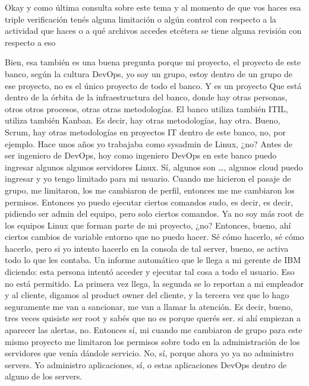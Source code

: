 \begin{description}[leftmargin=0cm, labelsep=0.5cm]
    \item[\textbf{MOCIULSKY SANTIAGO:}] Okay y como última consulta sobre este tema y al momento de que vos haces esa triple verificación tenés alguna limitación o algún control con respecto a la actividad que haces o a qué archivos accedes etcétera se tiene alguna revisión con respecto a eso

    \item[\textbf{VILLARINO PABLO RODOLFO:}] Bien, esa también es una buena pregunta porque mi proyecto, el proyecto de este banco, según la cultura DevOps, yo soy un grupo, estoy dentro de un grupo de ese proyecto, no es el único proyecto de todo el banco. Y es un proyecto Que está dentro de la órbita de la infraestructura del banco, donde hay otras personas, otros otros procesos, otras otras metodologías. El banco utiliza también ITIL, utiliza también Kanban. Es decir, hay otras metodologías, hay otra. Bueno, Scrum, hay otras metodologías en proyectos IT dentro de este banco, no, por ejemplo. Hace unos años yo trabajaba como sysadmin de Linux, ¿no? Antes de ser ingeniero de DevOps, hoy como ingeniero DevOps en este banco puedo ingresar algunos algunos servidores Linux. Sí, algunos son …, algunos cloud puedo ingresar y yo tengo limitado para mi usuario. Cuando me hicieron el pasaje de grupo, me limitaron, los me cambiaron de perfil, entonces me me cambiaron los permisos. Entonces yo puedo ejecutar ciertos comandos sudo, es decir, es decir, pidiendo ser admin del equipo, pero solo ciertos comandos. Ya no soy más root de los equipos Linux que forman parte de mi proyecto, ¿no? Entonces, bueno, ahí ciertos cambios de variable entorno que no puedo hacer. Sé cómo hacerlo, sé cómo hacerlo, pero si yo intento hacerlo en la consola de tal server, bueno, se activa todo lo que les contaba. Un informe automático que le llega a mi gerente de IBM diciendo: esta persona intentó acceder y ejecutar tal cosa a todo el usuario. Eso no está permitido. La primera vez llega, la segunda se lo reportan a mi empleador y al cliente, digamos al product owner del cliente, y la tercera vez que lo hago seguramente me van a sancionar, me van a llamar la atención. Es decir, bueno, tres veces quisiste ser root y sabés que no es porque querés ser. si ahí empiezan a aparecer las alertas, no. Entonces sí, mi cuando me cambiaron de grupo para este mismo proyecto me limitaron los permisos sobre todo en la administración de los servidores que venía dándole servicio. No, sí, porque ahora yo ya no administro servers. Yo administro aplicaciones, sí, o estas aplicaciones DevOps dentro de alguno de los servers.


\end{description}
